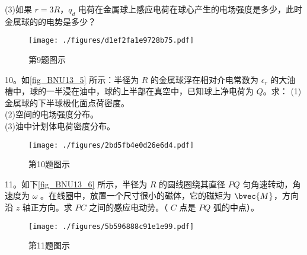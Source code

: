 (3)如果 $r=3R$，$q_d$ 电荷在金属球上感应电荷在球心产生的电场强度是多少，此时金属球的的电势是多少？
\begin{figure}[ht]
\centering
\texttt{[image: ./figures/d1ef2fa1e9728b75.pdf]}
\caption{第9题图示} \label{fig_BNU13_4}
\end{figure}
10。如\autoref{fig_BNU13_5} 所示：半径为 $R$ 的金属球浮在相对介电常数为 $\epsilon_r$ 的大油槽中，球的一半浸在油中，球的上半部在真空中，已知球上净电荷为 $Q$。求：
(1)金属球的下半球极化面点荷密度。\\
(2)空间的电场强度分布。\\
(3)油中计划体电荷密度分布。
\begin{figure}[ht]
\centering
\texttt{[image: ./figures/2bd5fb4e0d26e6d4.pdf]}
\caption{第10题图示} \label{fig_BNU13_5}
\end{figure}
11。如下\autoref{fig_BNU13_6} 所示，半径为 $R$ 的圆线圈绕其直径 $PQ$ 匀角速转动，角速度为 $\omega$ 。在线圈中，放置一个尺寸很小的磁体，它的磁矩为 $
\bvec{M}$，方向沿 $z$ 轴正方向。求 $PC$ 之间的感应电动势。（ $C$ 点是 $PQ$ 弧的中点）。
\begin{figure}[ht]
\centering
\texttt{[image: ./figures/5b596888c91e1e99.pdf]}
\caption{第11题图示} \label{fig_BNU13_6}
\end{figure}